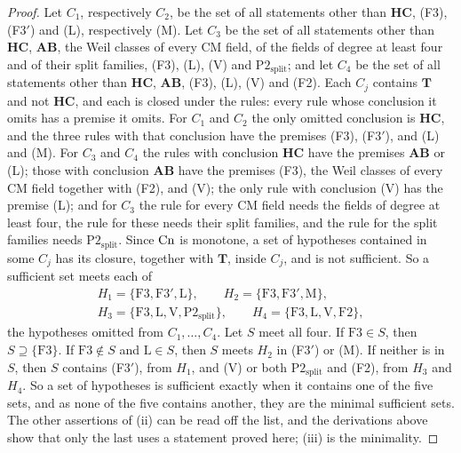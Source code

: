 \begin{proof}
Let $C_{1}$, respectively $C_{2}$, be the set of all statements other than
$\mathbf{HC}$, (F3), (F3$'$) and (L), respectively (M). Let $C_{3}$ be the
set of all statements other than $\mathbf{HC}$, $\mathbf{AB}$, the Weil
classes of every CM field, of the fields of degree at least four and of their
split families, (F3), (L), (V) and $\mathrm{P2}_{\mathrm{split}}$; and let
$C_{4}$ be the set of all statements other than $\mathbf{HC}$,
$\mathbf{AB}$, (F3), (L), (V) and (F2). Each $C_{j}$ contains $\mathbf{T}$
and not $\mathbf{HC}$, and each is closed under the rules: every rule whose
conclusion it omits has a premise it omits. For $C_{1}$ and $C_{2}$ the only
omitted conclusion is $\mathbf{HC}$, and the three rules with that
conclusion have the premises (F3), (F3$'$), and (L) and (M). For $C_{3}$
and $C_{4}$ the rules with conclusion $\mathbf{HC}$ have the premises
$\mathbf{AB}$ or (L); those with conclusion $\mathbf{AB}$ have the premises
(F3), the Weil classes of every CM field together with (F2), and (V); the
only rule with conclusion (V) has the premise (L); and for $C_{3}$ the rule
for every CM field needs the fields of degree at least four, the rule for
these needs their split families, and the rule for the split families needs
$\mathrm{P2}_{\mathrm{split}}$. Since $\mathrm{Cn}$ is monotone, a set of
hypotheses contained in some $C_{j}$ has its closure, together with
$\mathbf{T}$, inside $C_{j}$, and is not sufficient. So a sufficient set
meets each of
\begin{gather*}
  H_{1}=\{\mathrm{F3},\mathrm{F3}',\mathrm{L}\},\qquad
  H_{2}=\{\mathrm{F3},\mathrm{F3}',\mathrm{M}\},\\
  H_{3}=\{\mathrm{F3},\mathrm{L},\mathrm{V},\mathrm{P2}_{\mathrm{split}}\},\qquad
  H_{4}=\{\mathrm{F3},\mathrm{L},\mathrm{V},\mathrm{F2}\},
\end{gather*}
the hypotheses omitted from $C_{1},\dots,C_{4}$. Let $S$ meet all four. If
$\mathrm{F3}\in S$, then $S\supseteq\{\mathrm{F3}\}$. If $\mathrm{F3}\notin S$
and $\mathrm{L}\in S$, then $S$ meets $H_{2}$ in (F3$'$) or (M). If neither is
in $S$, then $S$ contains (F3$'$), from $H_{1}$, and (V) or both
$\mathrm{P2}_{\mathrm{split}}$ and (F2), from $H_{3}$ and $H_{4}$. So a set
of hypotheses is sufficient exactly when it contains one of the five sets,
and as none of the five contains another, they are the minimal sufficient
sets. The other assertions of (ii) can be read off the list, and the
derivations above show that only the last uses a statement proved here;
(iii) is the minimality.


\end{proof}
